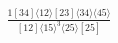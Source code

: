 \documentclass[varwidth, border=5pt]{standalone}
\begin{document}
\begin{my}
$\begin{gathered}
\scriptscriptstyle\frac{1[34]⟨12⟩[23]⟨34⟩⟨45⟩}{[12]⟨15⟩^3⟨25⟩[25]}
\end{gathered}$
\end{my}
\end{document}
